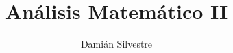 \documentclass[11pt,fleqn]{book} %
\theoremstyle{plain}
\theoremstyle{definition}
\theoremstyle{remark}
\begin{document}
\title{Análisis Matemático II}
\author{Damián Silvestre}
\maketitle



\end{document}
